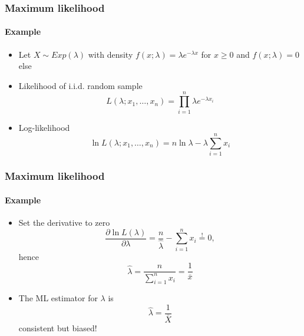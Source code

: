 \documentclass[notes=show]{beamer}
\begin{document}
\begin{frame}\frametitle{Maximum likelihood}\framesubtitle{Example}
\begin{itemize}
    \item Let $X\sim Exp(\lambda )$ with density $f\left( x;\lambda \right) =\lambda e^{-\lambda x}$ for $x\geq 0$ \newline
     and $f\left( x;\lambda \right) =0$ else
    \item Likelihood of i.i.d. random sample
    \begin{equation*}
        L(\lambda ;x_{1},\ldots ,x_{n})=\prod_{i=1}^{n}\lambda e^{-\lambda x_{i}}
    \end{equation*}
    \item Log-likelihood
    \begin{equation*}
        \ln L(\lambda ;x_{1},\ldots ,x_{n})=n\ln \lambda -\lambda \sum_{i=1}^{n}x_{i}
    \end{equation*}
\end{itemize}
\end{frame}


\begin{frame}\frametitle{Maximum likelihood}\framesubtitle{Example}
\begin{itemize}
    \item Set the derivative to zero
    \begin{equation*}
        \frac{\partial \ln L(\lambda )}{\partial \lambda }=\frac{n}{\hat{\lambda}}-\sum\limits_{i=1}^{n}x_{i}\overset{!}{=}0,
    \end{equation*}
    hence
    \begin{equation*}
        \hat{\lambda}=\frac{n}{\sum_{i=1}^{n}x_{i}}=\frac{1}{\bar{x}}
    \end{equation*}
    \item The ML estimator for $\lambda $ is
    \begin{equation*}
        \hat{\lambda}=\frac{1}{\bar{X}}
    \end{equation*}
    consistent but biased!
\end{itemize}
\end{frame}
\end{document}
